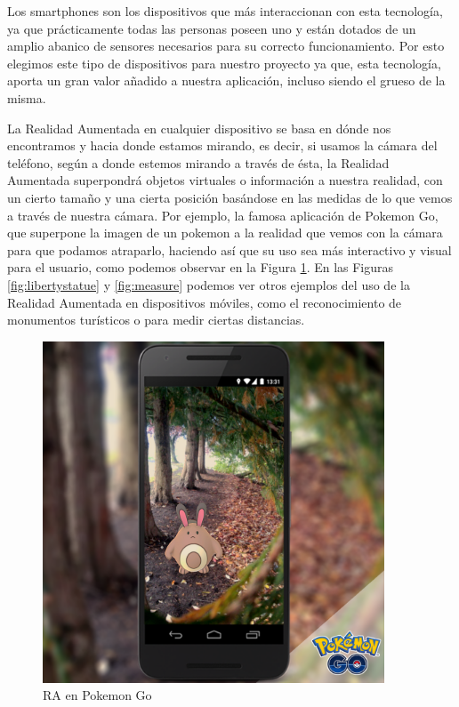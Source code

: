 Los smartphones son los dispositivos que más interaccionan con esta tecnología, ya que prácticamente todas las personas poseen uno
 y están dotados de un amplio abanico de sensores necesarios para su correcto funcionamiento. Por esto elegimos este tipo de dispositivos para nuestro
 proyecto ya que, esta tecnología, aporta un gran valor añadido a nuestra aplicación, incluso siendo el grueso de la misma. 

 La Realidad Aumentada en cualquier dispositivo se basa en dónde nos encontramos y hacia donde estamos mirando, es decir, si usamos la cámara del teléfono,
 según a donde estemos mirando a través de ésta, la Realidad Aumentada superpondrá objetos virtuales o información a nuestra realidad, con un cierto tamaño y una cierta posición
 basándose en las medidas de lo que vemos a través de nuestra cámara. Por ejemplo, la famosa aplicación de Pokemon Go, que superpone la imagen de un pokemon a la realidad
 que vemos con la cámara para que podamos atraparlo, haciendo así que su uso sea más interactivo y visual para el usuario, como podemos observar en la Figura \ref{fig:pokemon}. En las Figuras \ref{fig:libertystatue} y \ref{fig:measure}
 podemos ver otros ejemplos del uso de la Realidad Aumentada en dispositivos móviles, como el reconocimiento de monumentos turísticos o para medir ciertas distancias.

 \begin{figure}[H]
    \centering
    \includegraphics[width=4in]{figures/chapter-2/pokemongo.png}
    \caption{RA en Pokemon Go\cite{pokemongo}}
    \label{fig:pokemon}
\end{figure}

